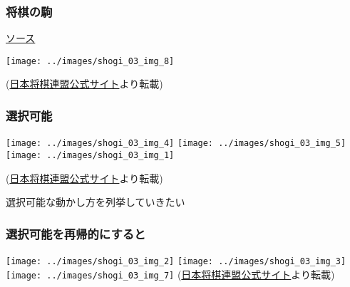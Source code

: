 \documentclass[xcolor=table]{beamer}
\begin{document}
\mdxtitleblockstart{}
\mdtitleauthorrunning{}{}\mdxtitleblockend%

\begin{mdframe}%

\frametitle{将棋の駒}\label{heading-section}%

\noindent{}\href{https://github.com/ayu-mushi/linebot/blob/master/Shogi.hs}{ソース}%

\texttt{[image: ../images/shogi\_03\_img\_8]}{}%

(\href{https://www.shogi.or.jp/knowledge/shogi/03.html}{日本将棋連盟公式サイト}より転載)%
\end{mdframe}\label{section}%

\begin{mdframe}%

\frametitle{選択可能}\label{heading-section}%

\noindent{}\texttt{[image: ../images/shogi\_03\_img\_4]}{}
\texttt{[image: ../images/shogi\_03\_img\_5]}{}
\texttt{[image: ../images/shogi\_03\_img\_1]}{}%

(\href{https://www.shogi.or.jp/knowledge/shogi/03.html}{日本将棋連盟公式サイト}より転載)%

選択可能な動かし方を列挙していきたい%
\end{mdframe}\label{section}%

\begin{mdframe}%

\frametitle{選択可能を再帰的にすると}\label{heading-section}%

\noindent{}\texttt{[image: ../images/shogi\_03\_img\_2]}{}
\texttt{[image: ../images/shogi\_03\_img\_3]}{}
\texttt{[image: ../images/shogi\_03\_img\_7]}{}
(\href{https://www.shogi.or.jp/knowledge/shogi/03.html}{日本将棋連盟公式サイト}より転載)%
\end{mdframe}\label{section}%
\end{document}
